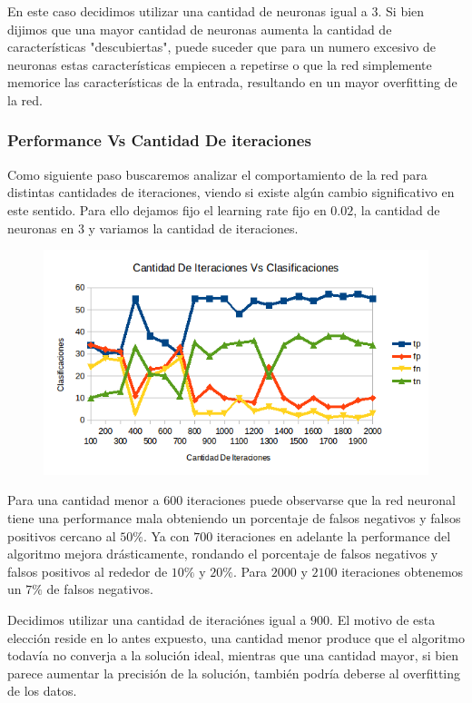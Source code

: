 En este caso decidimos utilizar una cantidad de neuronas igual a $3$. Si bien dijimos que una mayor cantidad de neuronas aumenta la cantidad de características "descubiertas", puede suceder que para un numero excesivo de neuronas estas características empiecen a repetirse o que la red simplemente memorice las características de la entrada, resultando en un mayor overfitting de la red.

\subsubsection{Performance Vs Cantidad De iteraciones} 

Como siguiente paso buscaremos analizar el comportamiento de la red para distintas cantidades de iteraciones, viendo si existe algún cambio significativo en este sentido. Para ello dejamos fijo el learning rate fijo en $0.02$, la cantidad de neuronas en $3$ y variamos la cantidad de iteraciones.

\begin{figure}[h!]
  \centering
    \includegraphics[scale=0.4]{ej1/iteraciones.png}
\end{figure}

Para una cantidad menor a $600$ iteraciones puede observarse que la red neuronal tiene una performance mala obteniendo un porcentaje de falsos negativos y falsos positivos cercano al $50\%$. Ya con $700$ iteraciones en adelante la performance del algoritmo mejora drásticamente, rondando el porcentaje de falsos negativos y falsos positivos al rededor de $10 \%$ y $20\%$. Para $2000$ y $2100$ iteraciones obtenemos un $7\%$  de falsos negativos.

Decidimos utilizar una cantidad de iteraciónes igual a $900$. El motivo de esta elección reside en lo antes expuesto, una cantidad menor produce que el algoritmo todavía no converja a la solución ideal, mientras que una cantidad mayor, si bien parece aumentar la precisión de la solución, también podría deberse al overfitting de los datos.

